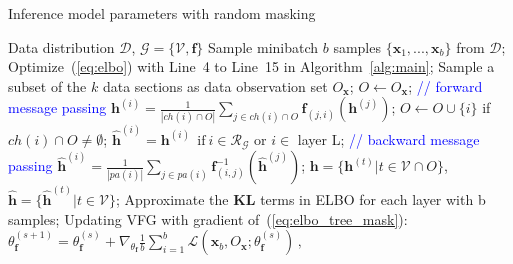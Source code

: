 \documentclass[twoside]{article}
\begin{document}
\begin{algorithm}[H]
   \caption{Inference model parameters with random masking}
   \label{alg:rand_mask}
\begin{algorithmic}[1]
    Data distribution $\mathcal{D}$,  $\mathcal{G} = \{\mathcal{V}, \mathbf{f}\}$
   \STATE  Sample minibatch $b$ samples $\{\mathbf{x}_1, ..., \mathbf{x}_b \}$ from $\mathcal{D}$;
   \STATE  
    Optimize~(\ref{eq:elbo}) with Line~4 to Line~15 in Algorithm~\ref{alg:main};
    \STATE  Sample a subset of the $k$ data sections as data observation set $O_{\mathbf{x}}$; $O \leftarrow O_{\mathbf{x}}$;
    \STATE  \textcolor{blue}{// forward message passing}
   \STATE $\mathbf{h}^{(i)} = \frac{1}{|ch(i) \cap O |} \sum_{j \in ch(i) \cap O} \mathbf{f}_{(j,i)}(\mathbf{h}^{(j)})$; 
     \STATE  $O \leftarrow O \cup \{i\}$ if $ch(i) \cap O \neq \emptyset $; 
    \ENDFOR
    \STATE $\widehat{\mathbf{h}}^{(i)} = \mathbf{h}^{(i)} \ \  \text{if} \ i \in \mathcal{R}_{\mathcal{G}} $ or $i \in$ layer L;
   \STATE \textcolor{blue}{// backward message passing}
   \STATE $\widehat{\mathbf{h}}^{(i)} = \frac{1}{|pa(i)|} \sum_{j \in pa(i) } \mathbf{f}^{-1}_{ (i,j)}(\widehat{\mathbf{h}}^{(j)}) $;%
   \ENDFOR
    \STATE  $\mathbf{h} =  \{\mathbf{h}^{(t)} \big |  t \in \mathcal{V} \cap O \}$, $\widehat{\mathbf{h}} =  \{\widehat{\mathbf{h}}^{(t)} \big | t \in \mathcal{V} \}$;
    \STATE Approximate the $\mathbf{KL}$ terms in ELBO for each layer with b samples;
    \STATE Updating VFG with gradient of~(\ref{eq:elbo_tree_mask}): $\theta^{(s+1)}_{\mathbf{f}} = \theta^{(s)}_{\mathbf{f}} + \nabla_{\theta_{\mathbf{f}}}\frac{1}{b} \sum_{i=1}^b  \mathcal{L}(\mathbf{x}_b, O_{\mathbf{x}}; \theta^{(s)}_{\mathbf{f}})   \, ,$
   \ENDFOR
\end{algorithmic}
\end{algorithm}
\end{document}
